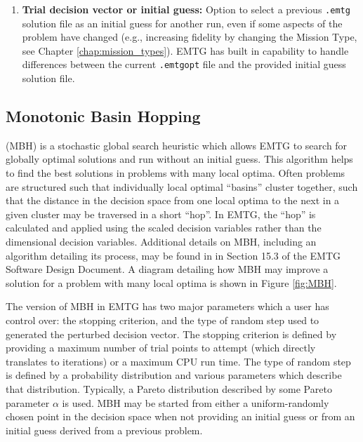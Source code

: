 \begin{enumerate}
    \item \textbf{Trial decision vector or initial guess:} Option to select a previous {\tt .emtg} solution file as an initial guess for another run, even if some aspects of the problem have changed (e.g., increasing fidelity by changing the Mission Type, see Chapter \ref{chap:mission_types}). \ac{EMTG} has built in capability to handle differences between the current {\tt .emtgopt} file and the provided initial guess solution file. 

\end{enumerate}




\subsection{Monotonic Basin Hopping}
\label{sec:monotonic_basin_hopping}
(\ac{MBH}) is a stochastic global search heuristic which allows \ac{EMTG} to search for globally optimal solutions and run without an initial guess. This algorithm helps to find the best solutions in problems with many local optima. Often problems are structured such that individually local optimal ``basins'' cluster together, such that the distance in the decision space from one local optima to the next in a given cluster may be traversed in a short ``hop''. In \ac{EMTG}, the ``hop'' is calculated and applied using the scaled decision variables rather than the dimensional decision variables. Additional details on \ac{MBH}, including an algorithm detailing its process, may be found in in Section 15.3 of the \ac{EMTG} Software Design Document. A diagram detailing how \ac{MBH} may improve a solution for a problem with many local optima is shown in Figure \ref{fig:MBH}.

\noindent The version of \ac{MBH} in \ac{EMTG} has two major parameters which a user has control over: the stopping criterion, and the type of random step used to generated the perturbed decision vector. The stopping criterion is defined by providing a maximum number of trial points to attempt (which directly translates to iterations) or a maximum CPU run time. The type of random step is defined by a probability distribution and various parameters which describe that distribution. Typically, a Pareto distribution described by some Pareto parameter $\alpha$ is used. \ac{MBH} may be started from either a uniform-randomly chosen point in the decision space when not providing an initial guess or from an initial guess derived from a previous problem.


